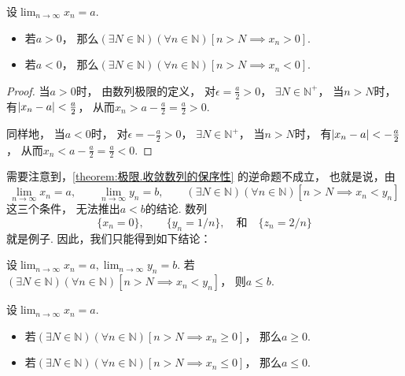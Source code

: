 \begin{corollary}[保号性]\label{theorem:极限.收敛数列的保号性}
设\(\lim_{n\to\infty}x_n = a\).
\begin{itemize}
	\item 若\(a > 0\)，
	那么\((\exists N\in\mathbb{N})
	(\forall n\in\mathbb{N})
	[n>N \implies x_n > 0]\).

	\item 若\(a < 0\)，
	那么\((\exists N\in\mathbb{N})
	(\forall n\in\mathbb{N})
	[n>N \implies x_n < 0]\).
\end{itemize}
\begin{proof}
当\(a > 0\)时，
由数列极限的定义，
对\(\epsilon = \frac{a}{2} > 0\)，
\(\exists N \in \mathbb{N}^+\)，
当\(n > N\)时，
有\(\abs{x_n - a} < \frac{a}{2}\)，
从而\(x_n > a - \frac{a}{2} = \frac{a}{2} > 0\).

同样地，
当\(a < 0\)时，
对\(\epsilon = -\frac{a}{2} > 0\)，
\(\exists N \in \mathbb{N}^+\)，
当\(n > N\)时，
有\(\abs{x_n - a} < -\frac{a}{2}\)，
从而\(x_n < a - \frac{a}{2} = \frac{a}{2} < 0\).
\end{proof}
\end{corollary}

需要注意到，\cref{theorem:极限.收敛数列的保序性} 的逆命题不成立，
也就是说，由\[
	\lim_{n\to\infty} x_n = a, \qquad
	\lim_{n\to\infty} y_n = b, \qquad
	(\exists N\in\mathbb{N})
	(\forall n\in\mathbb{N})
	[n>N \implies x_n < y_n]
\]这三个条件，
无法推出\(a<b\)的结论.
数列\[
	\{x_n = 0\}, \qquad
	\{y_n = 1/n\},
	\quad\text{和}\quad
	\{z_n = 2/n\}
\]就是例子.
因此，我们只能得到如下结论：
\begin{proposition}\label{theorem:数列极限.夹逼准则.引理}
设\(\lim_{n\to\infty} x_n = a,
\lim_{n\to\infty} y_n = b\).
若\((\exists N\in\mathbb{N})
(\forall n\in\mathbb{N})
[n>N \implies x_n < y_n]\)，
则\(a \leq b\).
\end{proposition}

\begin{corollary}
设\(\lim_{n\to\infty} x_n = a\).
\begin{itemize}
	\item 若\((\exists N\in\mathbb{N})
	(\forall n\in\mathbb{N})
	[n > N \implies x_n \geq 0]\)，
	那么\(a \geq 0\).

	\item 若\((\exists N\in\mathbb{N})
	(\forall n\in\mathbb{N})
	[n > N \implies x_n \leq 0]\)，
	那么\(a \leq 0\).
\end{itemize}
\end{corollary}

